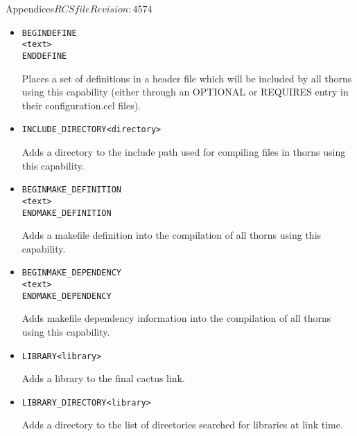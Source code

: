 \begin{cactuspart}{Appendices}{$RCSfile$}{$Revision: 4574 $}
\begin{itemize}


\item

\begin{alltt}
BEGIN DEFINE 
<text>
END DEFINE
\end{alltt}

Places a set of definitions in a header file which will be included by
all thorns using this capability (either through an OPTIONAL or
REQUIRES entry in their configuration.ccl files).

\item

\begin{alltt}
INCLUDE_DIRECTORY  <directory>
\end{alltt}

Adds a directory to the include path used for compiling files in
thorns using this capability.

\item

\begin{alltt}
BEGIN MAKE_DEFINITION 
<text>
END MAKE_DEFINITION
\end{alltt}

Adds a makefile definition into the compilation of all thorns using
this capability.

\item

\begin{alltt}
BEGIN MAKE_DEPENDENCY 
<text>
END MAKE_DEPENDENCY 
\end{alltt}

Adds makefile dependency information into the compilation of all
thorns using this capability.

\item

\begin{alltt}
LIBRARY <library>
\end{alltt}

Adds a library to the final cactus link.

\item

\begin{alltt}
LIBRARY_DIRECTORY <library>
\end{alltt}

Adds a directory to the list of directories searched for libraries at
link time.


\end{itemize}
\end{cactuspart}
